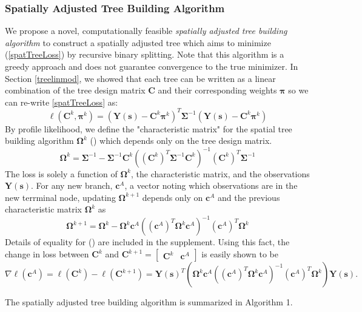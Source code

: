 \documentclass[12pt]{article}
\newcommand{\proc}{\mathbf{Y}(\mathbf{s})}
\newcommand{\tdsgn}{\mathbf{C}^k}
\newcommand{\tcntrst}{\boldsymbol{\pi}^k}
\newcommand{\Sig}{\boldsymbol{\Sigma}}
\newcommand{\Om}{\boldsymbol{\Omega}}
\newcommand{\ca}{\mathbf{c}^A}
\newcommand{\cat}{ \left(\mathbf{c}^A\right)^T}
\begin{document}
\subsubsection{Spatially Adjusted Tree Building Algorithm}
\label{spatTreesec}

We propose a novel, computationally feasible \textit{spatially adjusted tree building algorithm} to construct a spatially adjusted tree which aims to minimize (\ref{spatTreeLoss}) by recursive binary splitting. Note that this algorithm is a greedy approach and does not guarantee convergence to the true minimizer. In Section \ref{treelinmod}, we showed that each tree can be written as a linear combination of the tree design matrix $\mathbf{C}$ and their corresponding weights $\boldsymbol{\pi}$ so we can re-write \ref{spatTreeLoss} as:
\begin{equation}
\ell(\tdsgn,\tcntrst ) = \left(\proc- \tdsgn \tcntrst \right)^T \Sig^{-1} \left(\proc-\tdsgn \tcntrst \right) \label{treeloss}
\end{equation}
By profile likelihood, we define the "characteristic matrix" for the spatial tree building algorithm $\Om^k$ () which depends only on the tree design matrix.
\begin{equation}
\Om^k = \Sig^{-1} - \Sig^{-1} \tdsgn \left((\tdsgn)^T \Sig^{-1} \tdsgn \right)^{-1} (\tdsgn)^T \Sig^{-1} \label{omeg}
\end{equation}
The loss is solely a function of $\Om^k$, the characteristic matrix, and the observations $\proc$.  For any new branch, $\ca$, a vector noting which observations are in the new terrminal node, updating $\Om^{k+1}$ depends only  on $\ca$ and the previous characteristic matrix $\Om^k$ as
\begin{equation}
\Om^{k+1} = \Om^k - \Om^k \ca \left( \cat \Om^k \ca \right)^{-1} \cat \Om^k \label{omega}
\end{equation}
Details of equality for () are included in the supplement. Using this fact, the change in loss between $\tdsgn$ and $\mathbf{C}^{k+1} = \begin{bmatrix} \tdsgn & \ca \end{bmatrix}$ is easily shown to be
\begin{equation}
\nabla \ell(\ca) = \ell(\tdsgn) - \ell(\mathbf{C}^{k+1}) = \proc^T \left(\Om^k \ca \left( \cat \Om^k \ca\right)^{-1} \cat \Om^k \right)\proc.
\end{equation}

The spatially adjusted tree building algorithm is summarized in Algorithm 1.
\end{document}
